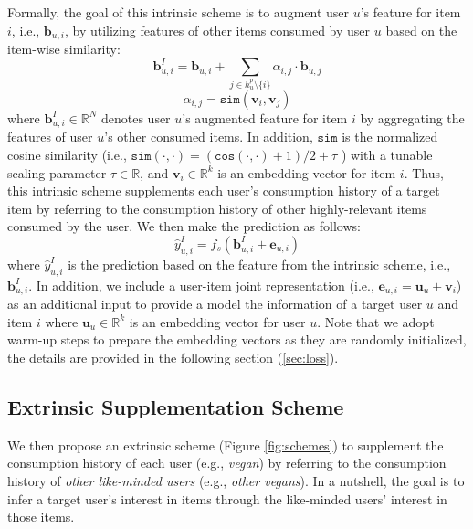 \documentclass[sigconf]{acmart}
\begin{document}
Formally, the goal of this intrinsic scheme is to augment user $u$'s feature for item $i$, i.e., $\textbf{b}_{u,i}$, by utilizing features of other items consumed by user $u$ based on the item-wise similarity: 
\begin{equation*}
    \textbf{b}_{u,i}^I = \textbf{b}_{u,i} + \sum_{j \in h_u^p \setminus{\{i\}}}\alpha_{i,j} \cdot \textbf{b}_{u,j}
\end{equation*}
\begin{equation}
    \alpha_{i,j} = \texttt{sim}(\textbf{v}_i, \textbf{v}_j)
    \label{eqn:sim}
\end{equation}
where $\textbf{b}_{u,i}^I\in \mathbb{R}^N$ denotes user $u$'s augmented feature for item $i$ by aggregating the features of user $u$'s other consumed items. In addition, $\mathtt{sim}$ is the normalized cosine similarity (i.e., $\mathtt{sim}(\cdot, \cdot)=(\mathtt{cos}(\cdot,\cdot)+1)/2 + \tau$ ) with a tunable scaling parameter $\tau \in \mathbb{R}$, and $\textbf{v}_i \in \mathbb{R}^k$ is an embedding vector for item $i$. 
Thus, this intrinsic scheme supplements each user's consumption history of a target item by referring to the consumption history of other highly-relevant items consumed by the user.
We then make the prediction as follows:
\begin{equation}
    \hat{y}_{u,i}^I = f_s(\textbf{b}_{u,i}^I + \textbf{e}_{u,i})
    \label{eqn:pred}
\end{equation}
where $\hat{y}_{u,i}^I$ is the prediction based on the feature from the intrinsic scheme, i.e., $\textbf{b}_{u,i}^I$. In addition, we include a user-item joint representation (i.e., $\textbf{e}_{u,i}=\textbf{u}_u+\textbf{v}_i$) as an additional input to provide a model the information of a target user $u$ and item $i$ where $\textbf{u}_u \in \mathbb{R}^k$ is an embedding vector for user $u$. Note that we adopt warm-up steps to prepare the embedding vectors as they are randomly initialized, the details are provided in the following section (\cref{sec:loss}). 



\subsection{Extrinsic Supplementation Scheme}
\label{sec:ex}
We then propose an extrinsic scheme (Figure \ref{fig:schemes}) to supplement the consumption history of each user (e.g., \textit{vegan}) by referring to the consumption history of \textit{other like-minded users} (e.g., \textit{other vegans}). In a nutshell, the goal is to infer a target user's interest in items through the like-minded users' interest in those items. 
\end{document}
